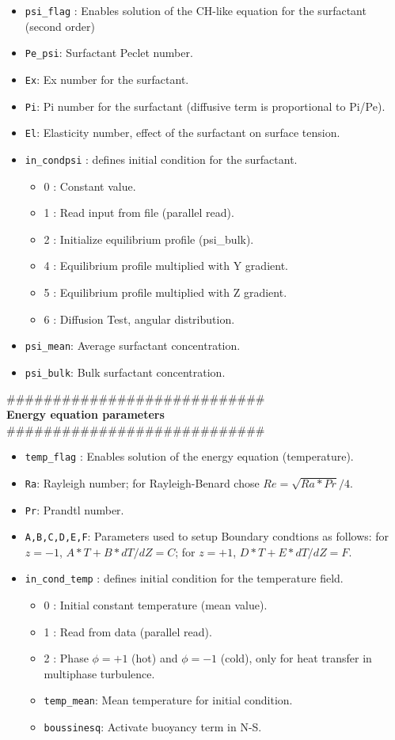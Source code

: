 \begin{itemize}[label={$\circ$}]
\item \texttt{psi\_flag} : Enables solution of the CH-like equation for the surfactant (second order)
\item \texttt{Pe\_psi}: Surfactant Peclet number.
\item \texttt{Ex}: Ex number for the surfactant.
\item \texttt{Pi}: Pi number for the surfactant (diffusive term is proportional to Pi/Pe).
\item \texttt{El}: Elasticity number, effect of the surfactant on surface tension.
\item \texttt{in\_condpsi} : defines initial condition for the surfactant.
\begin{itemize}[label={$\circ$}]
\item 0 : Constant value.
\item 1 : Read input from file (parallel read).
\item 2 : Initialize equilibrium profile (psi\_bulk).
\item 4 : Equilibrium profile multiplied with Y gradient.
\item 5 : Equilibrium profile multiplied with Z gradient.
\item 6 : Diffusion Test, angular distribution.
\end{itemize}
\item \texttt{psi\_mean}: Average surfactant concentration.
\item \texttt{psi\_bulk}: Bulk surfactant concentration.
\end{itemize}
\#\#\#\#\#\#\#\#\#\#\#\#\#\#\#\#\#\#\#\#\#\#\#\#\#\#\#\#\\
{\bf Energy equation parameters}\\
\#\#\#\#\#\#\#\#\#\#\#\#\#\#\#\#\#\#\#\#\#\#\#\#\#\#\#\#
\begin{itemize}[label={$\circ$}]
\item \texttt{temp\_flag} : Enables solution of the energy equation (temperature).
\item \texttt{Ra}: Rayleigh number; for Rayleigh-Benard chose $Re=\sqrt{Ra*Pr}/4$.
\item \texttt{Pr}: Prandtl number.
\item \texttt{A,B,C,D,E,F}: Parameters used to setup Boundary condtions as follows: for $z=-1$, $A*T + B*dT/dZ=C$; for $z=+1$, $D*T + E*dT/dZ=F$. 
\item \texttt{in\_cond\_temp} : defines initial condition for the temperature field.
\begin{itemize}[label={$\circ$}]
\item 0 : Initial constant temperature (mean value).
\item 1 : Read from data (parallel read).
\item 2 : Phase $\phi=+1$ (hot) and $\phi=-1$ (cold), only for heat transfer in multiphase turbulence.
\item \texttt{temp\_mean}: Mean temperature for initial condition.
\item \texttt{boussinesq}: Activate buoyancy term in N-S.
\end{itemize}
\end{itemize}
